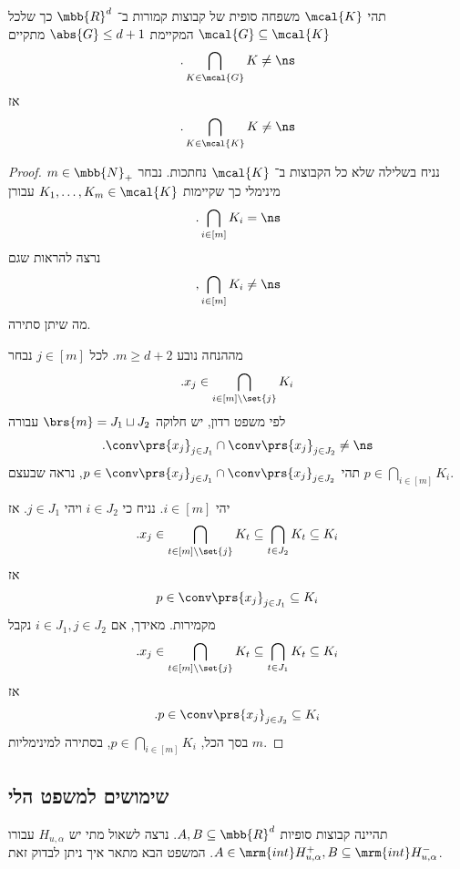 \documentclass[a4paper,10pt,twoside,openany]{book}
\begin{document}
\begin{theorem}[הלי]
תהי
$\mcal{K}$
משפחה סופית של קבוצות קמורות ב־%
$\mbb{R}^d$
כך שלכל
$\mcal{G} \subseteq \mcal{K}$
המקיימת
$\abs{G} \leq d+1$
מתקיים
\[\text{.} \bigcap_{K \in \mcal{G}} K \neq \ns\]
אז
\[\text{.} \bigcap_{K \in \mcal{K}} K \neq \ns\]
\end{theorem}

\begin{proof}
נניח בשלילה שלא כל הקבוצות ב־%
$\mcal{K}$
נחתכות. נבחר
$m \in \mbb{N}_+$
מינימלי כך שקיימות
$K_1, \ldots, K_m \in \mcal{K}$
עבורן
\begin{align*}
\text{.} \bigcap_{i \in [m]} K_i = \ns
\end{align*}
נרצה להראות שגם
\[\text{,} \bigcap_{i \in [m]} K_i \neq \ns\]
מה שיתן סתירה.

מההנחה נובע
$m \geq d+2$.
לכל
$j \in [m]$
נבחר
\[\text{.} x_j \in \bigcap_{i \in [m] \setminus \set{j}} K_i\]
לפי משפט רדון, יש חלוקה
$\brs{m} = J_1 \sqcup J_2$
עבורה
\[\text{.} \conv\prs{x_j}_{j \in J_1} \cap \conv\prs{x_j}_{j \in J_2} \neq \ns\]
תהי
$p \in \conv\prs{x_j}_{j \in J_1} \cap \conv\prs{x_j}_{j \in J_2}$,
נראה שבעצם
$p \in \bigcap_{i \in [m]} K_i$.

יהי
$i \in [m]$.
נניח כי
$i \in J_2$
ויהי
$j \in J_1$.
אז
\begin{align*}
\text{.} x_j \in \bigcap_{t \in [m] \setminus \set{j}} K_t \subseteq \bigcap_{t \in J_2} K_t \subseteq K_i
\end{align*}
אז
\begin{align*}
p \in \conv\prs{x_j}_{j \in J_1} \subseteq K_i
\end{align*}
מקמירות.
מאידך, אם
$i \in J_1, j \in J_2$
נקבל
\begin{align*}
\text{.} x_j \in \bigcap_{t \in [m] \setminus \set{j}} K_t \subseteq \bigcap_{t \in J_1} K_t \subseteq K_i
\end{align*}
אז
\begin{align*}
\text{.} p \in \conv\prs{x_j}_{j \in J_2} \subseteq K_i
\end{align*}
בסך הכל,
$p \in \bigcap_{i \in [m]} K_i$,
בסתירה למינימליות
$m$.
\end{proof}

\subsection{שימושים למשפט הלי}

תהיינה קבוצות סופיות
$A,B \subseteq \mbb{R}^d$.
נרצה לשאול מתי יש
$H_{u,\alpha}$
עבורו
$A \in \mrm{int} H_{u,\alpha}^+, B \subseteq \mrm{int} H_{u,\alpha}^-$.
המשפט הבא מתאר איך ניתן לבדוק זאת.
\end{document}
